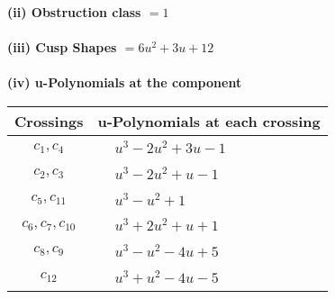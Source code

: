 \documentclass[1p]{elsarticle_modified}
\theoremstyle{definition}
\begin{document}
\flushleft \textbf{(ii) Obstruction class $= 1$}\\~\\
\flushleft \textbf{(iii) Cusp Shapes $= 6 u^2+3 u+12$}\\~\\
\newpage\renewcommand{\arraystretch}{1}
\flushleft \textbf{(iv) u-Polynomials at the component}\newline \\
\begin{tabular}{m{50pt}|m{274pt}}
Crossings & \hspace{64pt}u-Polynomials at each crossing \\
\hline $$\begin{aligned}c_{1},c_{4}\end{aligned}$$&$\begin{aligned}
&u^3-2 u^2+3 u-1
\end{aligned}$\\
\hline $$\begin{aligned}c_{2},c_{3}\end{aligned}$$&$\begin{aligned}
&u^3-2 u^2+u-1
\end{aligned}$\\
\hline $$\begin{aligned}c_{5},c_{11}\end{aligned}$$&$\begin{aligned}
&u^3- u^2+1
\end{aligned}$\\
\hline $$\begin{aligned}c_{6},c_{7},c_{10}\end{aligned}$$&$\begin{aligned}
&u^3+2 u^2+u+1
\end{aligned}$\\
\hline $$\begin{aligned}c_{8},c_{9}\end{aligned}$$&$\begin{aligned}
&u^3- u^2-4 u+5
\end{aligned}$\\
\hline $$\begin{aligned}c_{12}\end{aligned}$$&$\begin{aligned}
&u^3+u^2-4 u-5
\end{aligned}$\\
\hline
\end{tabular}\\~\\
\end{document}
